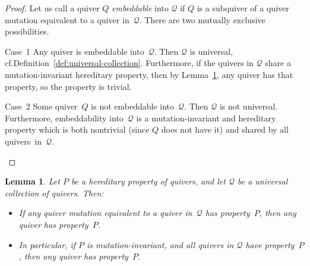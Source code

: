 \documentclass[10pt]{amsart}
\newtheorem{lemma}[theorem]{Lemma}
\theoremstyle{definition}
\newtheorem{remark}[theorem]{Remark}
\newenvironment{enonce*}[2][]{\par\medskip\noindent\textit{#2.}\ }{\par\medskip}
\newcommand{\cf}{cf.}
\newcommand{\ie}{i.e.}
\begin{document}
\begin{proof}
Let us call a quiver $Q$ \emph{embeddable} into $\mathcal{Q}$ if $Q$ is a subquiver of a quiver mutation equivalent to a quiver in~$\mathcal{Q}$. There are two mutually exclusive possibilities.

\begin{enonce*}[remark]{Case~1} Any quiver is embeddable into~$\mathcal{Q}$. Then $\mathcal{Q}$ is universal, \cf Definition~\ref{def:universal-collection}. Furthermore, if the quivers in $\mathcal{Q}$ share a mutation-invariant hereditary property, then by Lemma~\ref{lem:enough-universal-collection}, any quiver has that property, so the property is trivial. 
\end{enonce*}

\begin{enonce*}[remark]{Case~2} Some quiver~$Q$ is not embeddable into~$\mathcal{Q}$. Then $\mathcal{Q}$ is not universal. Furthermore, embeddability into~$\mathcal{Q}$ is a mutation-invariant and hereditary property which is both nontrivial (since $Q$ does not have it) and shared by all quivers~in~$\mathcal{Q}$. \qedhere
\end{enonce*}
\end{proof}

\begin{lemma}
\label{lem:enough-universal-collection}
Let $P$ be a hereditary property of quivers, 
and let $\mathcal{Q}$ be a universal collection of quivers. 
 Then: 
\begin{itemize}%
\item
If any quiver mutation equivalent to a quiver in~$\mathcal{Q}$ has property~$P$, 
then any quiver has property~$P$.
\item
In particular, if $P$ is mutation-invariant, and all quivers in $\mathcal{Q}$ have property~$P$, 
then any quiver has property~$P$.
\end{itemize}
\end{lemma}
\end{document}
